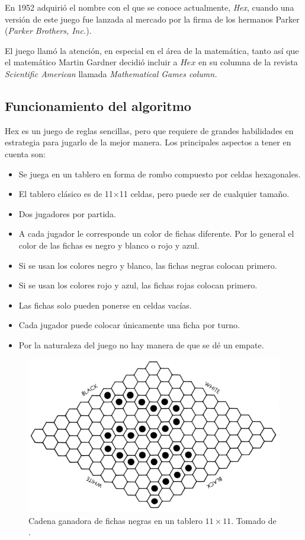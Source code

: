 \documentclass[12pt,letterpaper]{article}
\begin{document}
En 1952 adquirió el nombre con el que se conoce actualmente, \textit{Hex}, cuando una versión de este juego fue lanzada al mercado por la firma de los hermanos Parker (\textit{Parker Brothers, Inc.}).

El juego llamó la atención, en especial en el área de la matemática, tanto así que el matemático Martin Gardner decidió incluir a $Hex$ en su columna de la revista \textit{Scientific American} llamada \textit{Mathematical Games column.}


\subsection{Funcionamiento del algoritmo}
Hex es un juego de reglas sencillas, pero que requiere de grandes habilidades en estrategia para jugarlo de la mejor manera. Los principales aspectos a tener en cuenta son:
\begin{itemize}
\item Se juega en un tablero en forma de rombo compuesto por celdas hexagonales.
\item El tablero clásico es de 11$\times$11 celdas, pero puede ser de cualquier tamaño.
\item Dos jugadores por partida.
\item A cada jugador le corresponde un color de fichas diferente. Por lo general el color de las fichas es negro y blanco o rojo y azul.
\item Si se usan los colores negro y blanco, las fichas negras colocan primero.
\item Si se usan los colores rojo y azul, las fichas rojas colocan primero.
\item Las fichas solo pueden ponerse en celdas vacías.
\item Cada jugador puede colocar únicamente una ficha por turno.
\item Por la naturaleza del juego no hay manera de que se dé un empate.
\end{itemize}

\begin{figure}[H]
\centering
\includegraphics[width=0.7\columnwidth]{tablero.png}
\caption{Cadena ganadora de fichas negras en un tablero $11\times 11$. Tomado de \cite{hexBook}.}
\label{fig:Tablero}
\end{figure}
\end{document}
